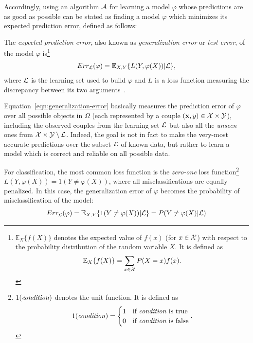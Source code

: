 Accordingly, using an algorithm ${\cal A}$ for learning a model $\varphi$ whose
predictions are as good as possible can be stated as finding a model $\varphi$
which minimizes its expected prediction error, defined as follows:

\begin{definition}
The \emph{expected prediction error}, also known as \emph{generalization
error} or \emph{test error}, of the model $\varphi$ is\footnote{$\mathbb{E}_X \{f(X)\}$ denotes the expected value of $f(x)$
(for $x \in {\cal X}$) with respect to the probability distribution of the
random variable $X$. It is defined as $$\mathbb{E}_X \{f(X)\} = \sum_{x \in {\cal
X}} P(X=x) f(x).$$}
\begin{equation}\label{eqn:generalization-error}
Err_{{\cal L}}(\varphi) = \mathbb{E}_{X, Y}\{ L(Y, \varphi(X)) | {\cal L} \},
\end{equation}
where ${\cal L}$ is the learning set used to build $\varphi$ and $L$ is a loss
function measuring the discrepancy between its two
arguments~\citep{geurts:2002}.
\end{definition}

Equation~\ref{eqn:generalization-error} basically measures the prediction error
of $\varphi$ over all possible objects in $\Omega$ (each represented by a couple
$(\mathbf{x}, y)\in {\cal X}\times{\cal Y}$), including the observed couples
from the learning set ${\cal L}$ but also all the \textit{unseen} ones from
${\cal X}\times{\cal Y} \setminus {\cal L}$. Indeed, the goal is not in fact to
make the very-most accurate predictions over the subset ${\cal L}$ of known
data, but rather to learn a model which is correct and reliable on all possible
data.

For classification, the most common loss function is the \textit{zero-one} loss
function\footnote{$1(\text{\textit{condition}})$ denotes the unit function. It
is defined as
$$1(\text{\textit{condition}}) =
\begin{cases}
1 & \text{if \textit{condition} is true}\\
0 & \text{if \textit{condition} is false}
\end{cases}.
$$} $L(Y, \varphi(X)) = 1(Y \neq \varphi(X))$, where all
misclassifications are equally penalized. In this case, the generalization
error of $\varphi$ becomes the probability of misclassification of the model:
\begin{equation}
Err_{\cal L}(\varphi) = \mathbb{E}_{X, Y}\{ 1(Y \neq \varphi(X)) | {\cal L} \} = P(Y \neq \varphi(X)|{\cal L})
\end{equation}

